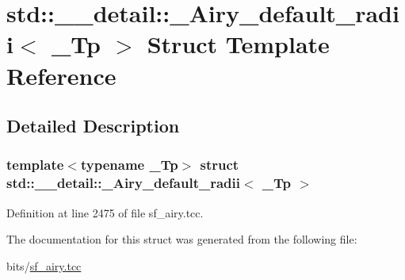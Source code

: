 \hypertarget{structstd_1_1____detail_1_1__Airy__default__radii}{}\section{std\+:\+:\+\_\+\+\_\+detail\+:\+:\+\_\+\+Airy\+\_\+default\+\_\+radii$<$ \+\_\+\+Tp $>$ Struct Template Reference}
\label{structstd_1_1____detail_1_1__Airy__default__radii}


\subsection{Detailed Description}
\subsubsection*{template$<$typename \+\_\+\+Tp$>$\newline
struct std\+::\+\_\+\+\_\+detail\+::\+\_\+\+Airy\+\_\+default\+\_\+radii$<$ \+\_\+\+Tp $>$}



Definition at line 2475 of file sf\+\_\+airy.\+tcc.



The documentation for this struct was generated from the following file\+:\begin{DoxyCompactItemize}
\item 
bits/\hyperlink{sf__airy_8tcc}{sf\+\_\+airy.\+tcc}\end{DoxyCompactItemize}
